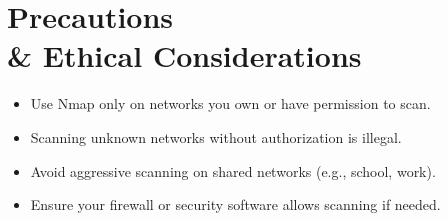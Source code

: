 \documentclass{article}
\begin{document}
\section{Precautions \\& Ethical Considerations}
\begin{itemize}
    \item Use Nmap only on networks you own or have permission to scan.
    \item Scanning unknown networks without authorization is illegal.
    \item Avoid aggressive scanning on shared networks (e.g., school, work).
    \item Ensure your firewall or security software allows scanning if needed.
\end{itemize}
\end{document}
